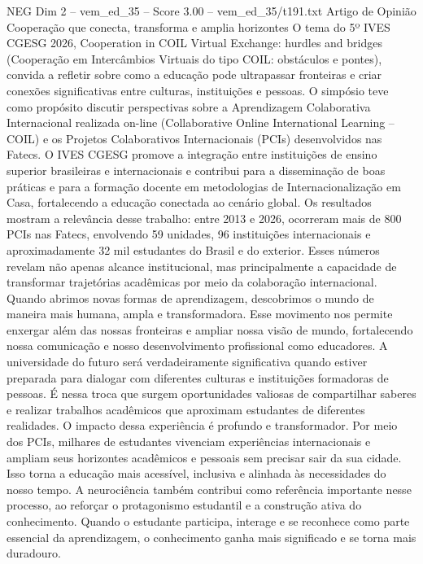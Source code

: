 \begin{textsample}{NEG Dim 2 – vem\_ed\_35 – Score 3.00 – vem\_ed\_35/t191.txt}  \label{ex:f2_neg_068}
Artigo de Opinião Cooperação que conecta, transforma e amplia horizontes O tema do 5º IVES CGESG 2026, Cooperation in COIL Virtual Exchange: hurdles and bridges (Cooperação em Intercâmbios Virtuais do tipo COIL: obstáculos e pontes), convida a refletir sobre como a educação pode ultrapassar fronteiras e criar conexões significativas entre culturas, instituições e pessoas.
O simpósio teve como propósito discutir perspectivas sobre a Aprendizagem Colaborativa Internacional realizada on-line (Collaborative Online International Learning – COIL) e os Projetos Colaborativos Internacionais (PCIs) desenvolvidos nas Fatecs.
O IVES CGESG promove a integração entre instituições de ensino superior brasileiras e internacionais e contribui para a disseminação de boas práticas e para a formação docente em metodologias de Internacionalização em Casa, fortalecendo a educação conectada ao cenário global.
Os resultados mostram a relevância desse trabalho: entre 2013 e 2026, ocorreram mais de 800 PCIs nas Fatecs, envolvendo 59 unidades, 96 instituições internacionais e aproximadamente 32 mil estudantes do Brasil e do exterior.
Esses números revelam não apenas alcance institucional, mas principalmente a capacidade de transformar trajetórias acadêmicas por meio da colaboração internacional.
Quando abrimos novas formas de aprendizagem, descobrimos o mundo de maneira mais humana, ampla e transformadora.
Esse movimento nos permite enxergar além das nossas fronteiras e ampliar nossa visão de mundo, fortalecendo nossa comunicação e nosso desenvolvimento profissional como educadores.
A universidade do futuro será verdadeiramente significativa quando estiver preparada para dialogar com diferentes culturas e instituições formadoras de pessoas.
É nessa troca que surgem oportunidades valiosas de compartilhar saberes e realizar trabalhos acadêmicos que aproximam estudantes de diferentes realidades.
O impacto dessa experiência é profundo e transformador.
Por meio dos PCIs, milhares de estudantes vivenciam experiências internacionais e ampliam seus horizontes acadêmicos e pessoais sem precisar sair da sua cidade.
Isso torna a educação mais acessível, inclusiva e alinhada às necessidades do nosso tempo.
A neurociência também contribui como referência importante nesse processo, ao reforçar o protagonismo estudantil e a construção ativa do conhecimento.
Quando o estudante participa, interage e se reconhece como parte essencial da aprendizagem, o conhecimento ganha mais significado e se torna mais duradouro.

\end{textsample}
